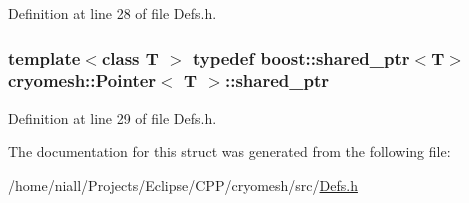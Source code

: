 \-Definition at line 28 of file \-Defs.\-h.

\hypertarget{structcryomesh_1_1Pointer_a825e9aaef4547bc1dd4c19424c162b89}{
\subsubsection[{shared\-\_\-ptr}]{\setlength{\rightskip}{0pt plus 5cm}template$<$class T $>$ typedef boost\-::shared\-\_\-ptr$<$\-T$>$ {\bf cryomesh\-::\-Pointer}$<$ \-T $>$\-::{\bf shared\-\_\-ptr}}}\label{structcryomesh_1_1Pointer_a825e9aaef4547bc1dd4c19424c162b89}


\-Definition at line 29 of file \-Defs.\-h.



\-The documentation for this struct was generated from the following file\-:\begin{DoxyCompactItemize}
\item 
/home/niall/\-Projects/\-Eclipse/\-C\-P\-P/cryomesh/src/\hyperlink{Defs_8h}{\-Defs.\-h}\end{DoxyCompactItemize}
